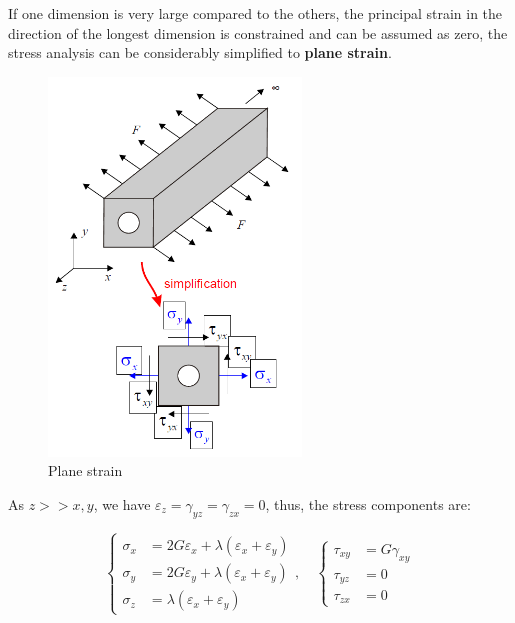 \documentclass[en,hazy,cyan,8pt,normal]{elegantnote}
\numberwithin{equation}{section}
\begin{document}
    If one dimension is very large compared to the others, the principal strain in the direction of the longest dimension is constrained and can be assumed as zero, the stress analysis can be considerably simplified to \textbf{plane strain}.

    \begin{figure}[H]
      \centering
      \includegraphics[width=0.6\textwidth]{image/021.png}
      \caption{Plane strain}
      \label{fig:021}
    \end{figure}

    As $z>>x,y$, we have $\varepsilon_z=\gamma_{yz}=\gamma_{zx}=0$, thus, the stress components are:

    \begin{equation}\label{eq:074}
      \left\{
      \begin{aligned}
        \sigma_x &= 2G \varepsilon_x + \lambda(\varepsilon_x + \varepsilon_y) \\
        \sigma_y &= 2G \varepsilon_y + \lambda(\varepsilon_x + \varepsilon_y) \\
        \sigma_z &= \lambda(\varepsilon_x + \varepsilon_y)
      \end{aligned}
      \right.
      , \quad
      \left\{
      \begin{aligned}
        \tau_{xy} &= G \gamma_{xy}\\
        \tau_{yz} &= 0 \\
        \tau_{zx} &= 0
      \end{aligned}
      \right.
    \end{equation}
\end{document}
